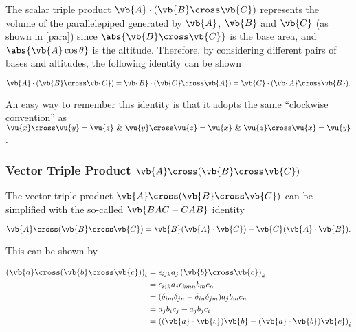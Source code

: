 \documentclass[a4paper,12pt]{report}
\begin{document}
The scalar triple product \(\vb{A} \cdot (\vb{B} \cross \vb{C})\) represents the volume of the parallelepiped generated by \(\vb{A}\), \(\vb{B}\) and \(\vb{C}\) (as shown in \cref{para}) since \(\abs{\vb{B} \cross \vb{C}}\) is the base area, and \(\abs{\vb{A}\cos{\theta}}\) is the altitude. Therefore, by considering different pairs of bases and altitudes, the following identity can be shown
	
\begin{equation} 
  \vb{A} \cdot (\vb{B} \cross \vb{C}) = \vb{B} \cdot (\vb{C} \cross \vb{A}) = \vb{C} \cdot (\vb{A} \cross \vb{B}). \label{scatri} 
\end{equation}
	
An easy way to remember this identity is that it adopts the same ``clockwise convention'' as \(\vu{x} \cross \vu{y} = \vu{z} ~  \&  ~ \vu{y} \cross \vu{z} = \vu{x} ~  \&  ~ \vu{z} \cross \vu{x} = \vu{y}\).
	

\subsubsection{Vector Triple Product \(\vb{A} \cross (\vb{B} \cross \vb{C})\)}
	
The vector triple product \(\vb{A} \cross (\vb{B} \cross \vb{C})\) can be simplified with the so-called \(\vb{BAC-CAB}\) identity
	
\begin{equation} 
	\vb{A} \cross (\vb{B} \cross \vb{C}) = \vb{B}(\vb{A} \cdot \vb{C}) - \vb{C}(\vb{A} \cdot \vb{B}). \label{vectri} 
\end{equation}		

This can be shown by 

\begin{equation}
    \begin{aligned} 
    \left( \vb{a} \cross (\vb{b} \cross \vb{c} ) \right)_{i} &= \epsilon _{ijk}a_{j}\left( \vb{b} \cross \vb{c}  \right)_{k} \\
    &= \epsilon _{ijk} a_{j}\epsilon _{kmn}b_{m}c_{n} \\
    &= (\delta _{im}\delta _{jn}-\delta _{in}\delta _{jm}) a_{j}b_{m}c_{n} \\
    &= a_{j}b_{i}c_{j}- a_{j}b_{j}c_{i} \\
    &= \left((\vb{a} \cdot \vb{c} )\vb{b} - (\vb{a} \cdot \vb{b} )\vb{c}\right)_{i}               
    \end{aligned} 
\end{equation}
\end{document}
